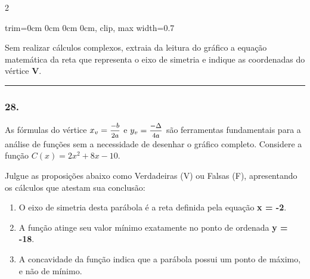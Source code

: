 \documentclass[twoside, 10pt, a4paper]{article}
\newlength{\espacoPreQuestao}
\newlength{\espacoQuestao}
\begin{document}
\begin{multicols*}{2}
\begin{center}
\begin{adjustbox}{trim=0cm 0cm 0cm 0cm, clip, max width=0.7\linewidth}
\end{adjustbox}
\end{center}

Sem realizar cálculos complexos, extraia da leitura do gráfico a equação matemática da reta que representa o eixo de simetria e indique as coordenadas do vértice \textbf{V}.
\par\vspace{\espacoQuestao}

\noindent\textcolor{CorLinha}{\rule{\linewidth}{0.5pt}} 
\par\vspace{\espacoPreQuestao}
\subsubsection*{28.} As fórmulas do vértice $x_v = \mfrac{-b}{2a}$ e $y_v = \mfrac{-\Delta}{4a}$ são ferramentas fundamentais para a análise de funções sem a necessidade de desenhar o gráfico completo. Considere a função $C(x) = 2x^2 + 8x - 10$.

Julgue as proposições abaixo como Verdadeiras (V) ou Falsas (F), apresentando os cálculos que atestam sua conclusão:

\begin{enumerate}[label=\Roman*.]
    \item O eixo de simetria desta parábola é a reta definida pela equação \textbf{x = -2}.
    \item A função atinge seu valor mínimo exatamente no ponto de ordenada \textbf{y = -18}.
    \item A concavidade da função indica que a parábola possui um ponto de máximo, e não de mínimo.
\end{enumerate}
\par\vspace{\espacoQuestao}


\end{multicols*}
\end{document}

